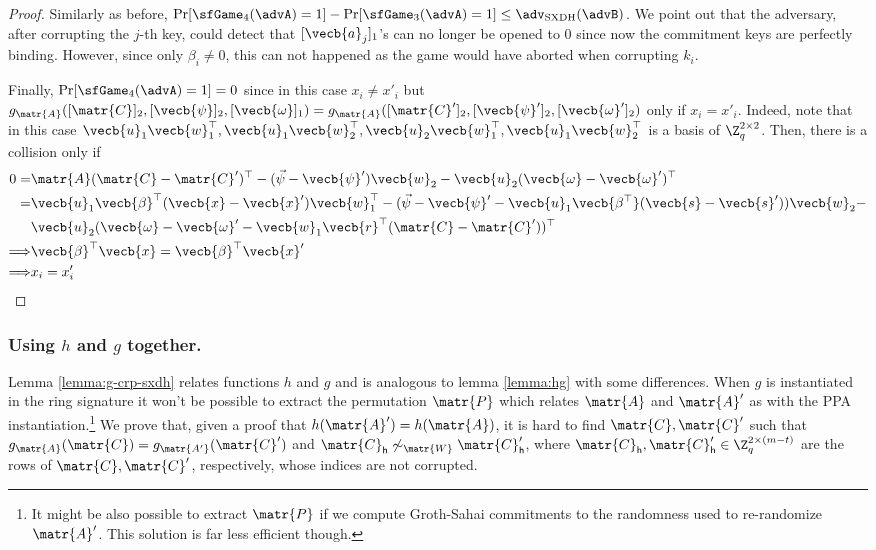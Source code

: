 \begin{proof}
Similarly as before, $\Pr[\sfGame_4(\advA)=1]-\Pr[\sfGame_3(\advA)=1]\leq\adv_\mathrm{SXDH}(\advB)$. We point out that the adversary, after corrupting the $j$-th key, could detect that $[\vecb{a}_j]_1$'s  can no longer be opened to 0 since now the commitment keys are perfectly binding. However, since only $\beta_i\neq 0$, this can not happened as the game would have aborted when corrupting $k_i$.

Finally, $\Pr[\sfGame_4(\advA)=1]=0$ since in this case $x_i \neq x'_i$ but $g_\matr{A}([\matr{C}]_2,[\vecb{\psi}]_2,\allowbreak[\vecb{\omega}]_1)=g_{\matr{A}}([\matr{C}']_2,[\vecb{\psi}']_2,[\vecb{\omega}']_2)$  only if $x_i = x'_i$. Indeed, note that in this case $\vecb{u}_1\vecb{w}_1^\top,\vecb{u}_1\vecb{w}_2^\top,\allowbreak\vecb{u}_2\vecb{w}_1^\top,\vecb{u}_1\vecb{w}_2^\top$ is a basis of $\Z_q^{2\times 2}$. Then, there is a collision only if
\begin{align*}
0=&\matr{A}(\matr{C}-\matr{C}')^\top - (\vec{\psi}-\vecb{\psi}')\vecb{w}_2 - \vecb{u}_2(\vecb{\omega}-\vecb{\omega}')^\top\\
=&\vecb{u}_1\vecb{\beta}^\top(\vecb{x}-\vecb{x}')\vecb{w}_1^\top - (\vec{\psi}-\vecb{\psi}'-\vecb{u}_1\vecb{\beta^\top}(\vecb{s}-\vecb{s}'))\vecb{w}_2 - \\
&\vecb{u}_2(\vecb{\omega}-\vecb{\omega}'-\vecb{w}_1\vecb{r}^\top(\matr{C}-\matr{C}'))^\top\\
\Longrightarrow & \vecb{\beta}^\top\vecb{x}=\vecb{\beta}^\top\vecb{x}' \\
\Longrightarrow  &x_i  = x'_i\\
\end{align*}
\end{proof}

\subsubsection{Using $h$ and $g$ together.}
Lemma \ref{lemma:g-crp-sxdh} relates functions $h$ and $g$ and is analogous to lemma \ref{lemma:hg} with some differences. When $g$ is instantiated in the ring signature it won't be possible to extract the permutation $\matr{P}$ which relates $\matr{A}$ and $\matr{A}'$ as with the PPA instantiation.\footnote{It might be also possible to extract $\matr{P}$ if we compute Groth-Sahai commitments to the randomness used to re-randomize $\matr{A}'$. This solution is far less efficient though.}
We prove that, given a proof that $h(\matr{A}')=h(\matr{A})$, it is hard to find $\matr{C},\matr{C}'$ such that $g_\matr{A}(\matr{C})=g_\matr{A'}(\matr{C}')$ and $\matr{C}_\mathsf{h}\not\sim_\matr{W}\matr{C}'_\mathsf{h}$, where $\matr{C}_\mathsf{h},\matr{C}'_\mathsf{h}\in\Z_q^{2\times(m-t)}$ are the rows of $\matr{C}, \matr{C}'$, respectively, whose indices are not corrupted.

